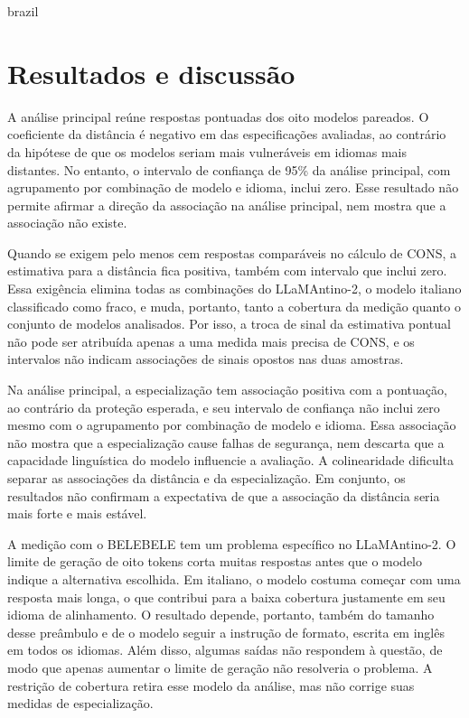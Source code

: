 \begin{otherlanguage*}{brazil}
\section*{Resultados e discussão}
A análise principal reúne \GMainN{} respostas pontuadas dos oito modelos pareados. O coeficiente da distância é negativo em \RDistanceNegativeCount{} das \RDistanceSpecCount{} especificações avaliadas, ao contrário da hipótese de que os modelos seriam mais vulneráveis em idiomas mais distantes. No entanto, o intervalo de confiança de 95\% da análise principal, com agrupamento por combinação de modelo e idioma, inclui zero. Esse resultado não permite afirmar a direção da associação na análise principal, nem mostra que a associação não existe.

Quando se exigem pelo menos cem respostas comparáveis no cálculo de CONS, a estimativa para a distância fica positiva, também com intervalo que inclui zero. Essa exigência elimina todas as combinações do LLaMAntino-2, o modelo italiano classificado como fraco, e muda, portanto, tanto a cobertura da medição quanto o conjunto de modelos analisados. Por isso, a troca de sinal da estimativa pontual não pode ser atribuída apenas a uma medida mais precisa de CONS, e os intervalos não indicam associações de sinais opostos nas duas amostras.

Na análise principal, a especialização tem associação positiva com a pontuação, ao contrário da proteção esperada, e seu intervalo de confiança não inclui zero mesmo com o agrupamento por combinação de modelo e idioma. Essa associação não mostra que a especialização cause falhas de segurança, nem descarta que a capacidade linguística do modelo influencie a avaliação. A colinearidade dificulta separar as associações da distância e da especialização. Em conjunto, os resultados não confirmam a expectativa de que a associação da distância seria mais forte e mais estável.

A medição com o BELEBELE tem um problema específico no LLaMAntino-2. O limite de geração de oito tokens corta muitas respostas antes que o modelo indique a alternativa escolhida. Em italiano, o modelo costuma começar com uma resposta mais longa, o que contribui para a baixa cobertura justamente em seu idioma de alinhamento. O resultado depende, portanto, também do tamanho desse preâmbulo e de o modelo seguir a instrução de formato, escrita em inglês em todos os idiomas. Além disso, algumas saídas não respondem à questão, de modo que apenas aumentar o limite de geração não resolveria o problema. A restrição de cobertura retira esse modelo da análise, mas não corrige suas medidas de especialização.


\end{otherlanguage*}
